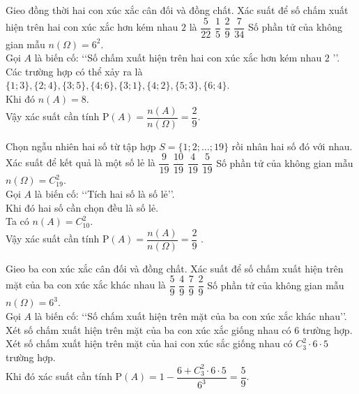 \begin{ex}%
	Gieo đồng thời hai con xúc xắc cân đối và đồng chất. Xác suất để số chấm xuất hiện trên hai con xúc xắc hơn kém nhau $2$ là
	\choice
	{$\dfrac{5}{22}$}
	{$\dfrac{1}{5}$}
	{\True $\dfrac{2}{9}$}
	{$\dfrac{7}{34}$}
	\loigiai
	{
		Số phần tử của không gian mẫu $n(\Omega)=6^2$.\\
		Gọi  $A$ là biến cố: \lq\lq Số chấm xuất hiện trên hai con xúc xắc hơn kém nhau $2$ \rq\rq.\\
		Các trường hợp có thể xảy ra là $\{1 ; 3\},\{2 ; 4\},\{3 ; 5\},\{4 ; 6\},\{3 ; 1\},\{4 ; 2\},\{5 ; 3\},\{6 ; 4\}$.\\
		Khi đó $n(A)=8$.\\
		Vậy xác suất cần tính $ \mathrm{P}(A)=\dfrac{n(A)}{n(\Omega)}=\dfrac{2}{9}$.		
	}	
\end{ex}
\begin{ex}%
	Chọn ngẫu nhiên hai số từ tập hợp $S=\{1 ; 2 ; \ldots ; 19\}$ rồi nhân hai số đó với nhau. Xác suất để kết quả là một số lẻ là
	\choice
	{$\dfrac{9}{19}$}
	{$\dfrac{10}{19}$}
	{$\dfrac{4}{19}$}
	{\True $\dfrac{5}{19}$}
	\loigiai
	{
		Số phần tử của không gian mẫu $n(\Omega)=C_{19}^{2}$.\\
		Gọi $A$ là biến cố: \lq\lq Tích hai số là số lẻ\rq\rq.\\
		Khi đó hai số cần chọn đều là số lẻ.\\
		Ta có $n(A)=C_{10}^{2}$.\\
		Vậy xác suất cần tính $ \mathrm{P}(A)=\dfrac{n(A)}{n(\Omega)}=\dfrac{2}{9}$ 	.	
	}	
\end{ex}
\begin{ex}%
	Gieo ba con xúc xắc cân đối và đồng chất. Xác suất để số chấm xuất hiện trên mặt của ba con xúc xắc khác nhau là
	\choice
	{\True $\dfrac{5}{9}$}
	{$\dfrac{4}{9}$}
	{$\dfrac{7}{9}$}
	{$\dfrac{2}{9}$}
	\loigiai
	{
		Số phần tử của không gian mẫu $n(\Omega)=6^3$.\\
		Gọi  $A$ là biến cố: \lq\lq Số chấm xuất hiện trên mặt của ba con xúc xắc khác nhau\rq\rq.\\
		Xét số chấm xuất hiện trên mặt của ba con xúc xắc giống nhau có $6$ trường hợp.\\
		Xét số chấm xuất hiện trên mặt của hai con xúc sắc giống nhau có $C_{3}^{2}\cdot 6\cdot 5$ trường hợp.\\
		Khi đó xác suất cần tính $ \mathrm{P}(A)=1-\dfrac{6+C_{3}^{2} \cdot 6 \cdot 5}{6^{3}}=\dfrac{5}{9}$. 		
	}	
\end{ex}
